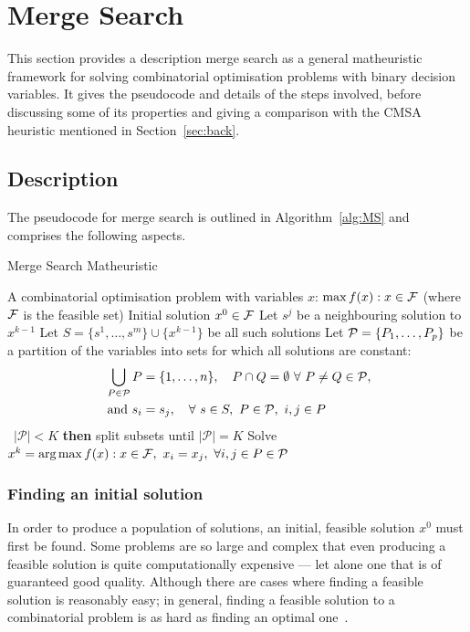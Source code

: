 \documentclass[journal]{IEEEtran}
\begin{document}
\section{Merge Search}\label{sec:merge}

This section provides a description merge search as a general matheuristic framework for solving combinatorial optimisation problems with binary decision variables. It gives the pseudocode and details of the steps involved, before discussing some of its properties and giving a comparison with the CMSA heuristic mentioned in Section~\ref{sec:back}.

\subsection{Description}
The pseudocode for merge search is outlined in Algorithm~\ref{alg:MS} and comprises the following aspects.

\begin{algorithm}[htb!]
\caption{{\sf Merge Search Matheuristic}} \label{alg:MS}
\begin{algorithmic}[1]
{\footnotesize
  \Require A combinatorial optimisation problem with variables $x$: $\max f(x) : x\in {\cal F}$ (where ${\cal F}$ is the feasible set)
  \Require Initial solution $x^0\in \cal F$
    \State Let $s^j$ be a neighbouring solution to $x^{k-1}$
    \label{step:nbhd}
      \EndFor
    \State Let  $S=\{s^1,\ldots,s^m\}\cup\{x^{k-1}\}$ be all such solutions
    \State Let ${\cal P}=\{P_1,\ldots,P_p\}$ be a partition of the variables into sets for which all solutions are constant:\label{step:P}
    \begin{align*}
      \bigcup_{P\in {\cal P}} P&=\{1,\ldots,n\},\quad P \cap Q=\emptyset\ \forall\ P\ne Q\in  {\cal P},\\
      \text{ and } s_i &= s_j, \quad \forall\ s\in S,\ P\in {\cal P},\ i,j\in P
    \end{align*}
   \ {$|\mathcal{P}| < K$} {\bf then} split subsets until $|\mathcal{P}|=K$ \label{step:RandSplit}
  \State Solve $x^k=\text{arg}\max f(x) : x\in {\cal F},\ x_i=x_j,\ \forall
  i,j\in P\in{\cal P}$\label{step:merge}
\EndFor
}
\end{algorithmic}
\end{algorithm}

\subsubsection*{\textbf{Finding an initial solution}}
In order to produce a population of solutions, an initial, feasible solution $x^0$ must first be found. Some problems are so large and complex that even producing a feasible solution is quite computationally expensive --- let alone one that is of guaranteed good quality. Although there are cases where finding a feasible solution is reasonably easy; in general, finding a feasible solution to a combinatorial problem is as hard as finding an optimal one~\cite{copalg}.
\end{document}
